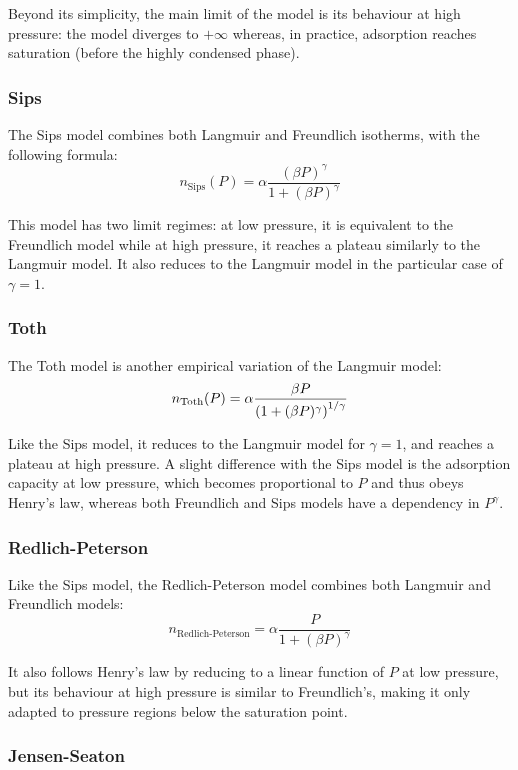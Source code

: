 \documentclass[main.tex]{subfiles}
\begin{document}
Beyond its simplicity, the main limit of the model is its behaviour at high pressure: the model diverges to $+\infty$ whereas, in practice, adsorption reaches saturation (before the highly condensed phase).

\subsubsection{Sips}

The Sips model combines both Langmuir and Freundlich isotherms, with the following formula:
\[n_\text{Sips}(P) = \alpha\frac{(\beta P)^\gamma}{1+(\beta P)^\gamma}\]

This model has two limit regimes: at low pressure, it is equivalent to the Freundlich model while at high pressure, it reaches a plateau similarly to the Langmuir model. It also reduces to the Langmuir model in the particular case of $\gamma = 1$.

\subsubsection{Toth}

The Toth model is another empirical variation of the Langmuir model:
\[n_\text{Toth}(P) = \alpha\frac{\beta P}{\left(1 + (\beta P)^\gamma\right)^{1/\gamma}}\]

Like the Sips model, it reduces to the Langmuir model for $\gamma = 1$, and reaches a plateau at high pressure. A slight difference with the Sips model is the adsorption capacity at low pressure, which becomes proportional to $P$ and thus obeys Henry's law, whereas both Freundlich and Sips models have a dependency in $P^\gamma$.

\subsubsection{Redlich-Peterson}

Like the Sips model, the Redlich-Peterson model combines both Langmuir and Freundlich models:
\[n_\text{Redlich-Peterson} = \alpha\frac{P}{1+ (\beta P)^\gamma}\]

It also follows Henry's law by reducing to a linear function of $P$ at low pressure, but its behaviour at high pressure is similar to Freundlich's, making it only adapted to pressure regions below the saturation point.

\subsubsection{Jensen-Seaton}
\end{document}
